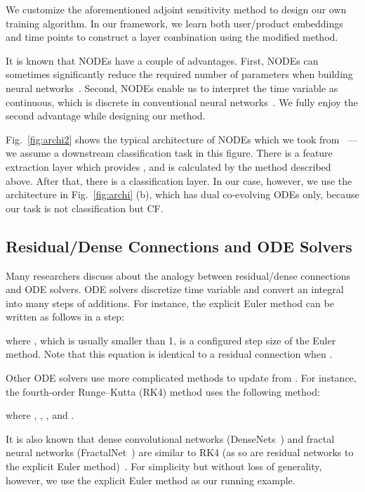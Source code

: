 \documentclass[sigconf]{acmart}
\begin{document}
We customize the aforementioned adjoint sensitivity method to design our own training algorithm. In our framework, we learn both user/product embeddings and time points  to construct a layer combination using the modified method.

It is known that NODEs have a couple of advantages. First, NODEs can sometimes significantly reduce the required number of parameters when building neural networks~\cite{2019arXiv191010470P}. Second, NODEs enable us to interpret the time variable  as continuous, which is discrete in conventional neural networks~\cite{NIPS2018_7892}. We fully enjoy the second advantage while designing our method.

Fig.~\ref{fig:archi2} shows the typical architecture of NODEs which we took from~\cite{NIPS2019_8577} --- we assume a downstream classification task in this figure. There is a feature extraction layer which provides , and  is calculated by the method described above. After that, there is a classification layer. In our case, however, we use the architecture in Fig.~\ref{fig:archi} (b), which has dual co-evolving ODEs only, because our task is not classification but CF.

\subsection{Residual/Dense Connections and ODE Solvers} Many researchers discuss about the analogy between residual/dense connections and ODE solvers. ODE solvers discretize time variable  and convert an integral into many steps of additions. For instance, the explicit Euler method can be written as follows in a step:
\begin{linenomath*}\end{linenomath*}where , which is usually smaller than 1, is a configured step size of the Euler method. Note that this equation is identical to a residual connection when .

Other ODE solvers use more complicated methods to update  from . For instance, the fourth-order Runge--Kutta (RK4) method uses the following method:
\begin{linenomath*}\end{linenomath*}where , , , and .

It is also known that dense convolutional networks (DenseNets~\cite{zhu2019convolutional}) and fractal neural networks (FractalNet~\cite{Larsson2017FractalNetUN}) are similar to RK4 (as so are residual networks to the explicit Euler method)~\cite{pmlr-v80-lu18d}. For simplicity but without loss of generality, however, we use the explicit Euler method as our running example.
\end{document}
